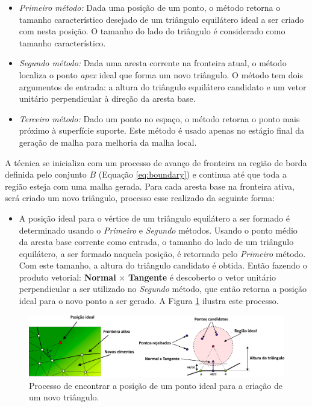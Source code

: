 \begin{itemize}  
\item \textit{Primeiro método:} Dada uma posição de um ponto, o método retorna o tamanho característico desejado de um triângulo equilátero ideal a ser criado com nesta posição. O tamanho do lado do triângulo é considerado como tamanho característico.
\item \textit{Segundo método:} Dada uma aresta corrente na fronteira atual, o método localiza o ponto \textit{apex} ideal que forma um novo triângulo. O método tem dois argumentos de entrada: a altura do triângulo equilátero candidato e um vetor unitário perpendicular à direção da aresta base. 
\item \textit{Terceiro método:} Dado um ponto no espaço, o método retorna o ponto mais próximo à superfície suporte. Este método é usado apenas no estágio final da geração de malha para melhoria da malha local.
\end{itemize}

A técnica se inicializa com um processo de avanço de fronteira na região de borda definida pelo conjunto $B$ (Equação \ref{eq:boundary}) e continua até que toda a região esteja com uma malha gerada. Para cada aresta base na fronteira ativa, será criado um novo triângulo, processo esse realizado da seguinte forma:

\begin{itemize}
    \item A posição ideal para o vértice de um triângulo equilátero a ser formado é determinado usando o \textit{Primeiro} e \textit{Segundo} métodos. Usando o ponto médio da aresta base corrente como entrada, o tamanho do lado de um triângulo equilátero, a ser formado naquela posição, é retornado pelo \textit{Primeiro} método. Com este tamanho, a altura do triângulo candidato é obtida. Então fazendo o produto vetorial: \textbf{Normal} $\times$ \textbf{Tangente} é descoberto o vetor unitário perpendicular a ser utilizado no \textit{Segundo} método, que então retorna a posição ideal para o novo ponto a ser gerado. A Figura \ref{fig:meshgeneration} ilustra este processo.
\end{itemize}

\begin{figure}[!h]
\captionsetup{width=\linewidth}
\centering
\includegraphics[width=\linewidth]{figuras/meshgeneration.jpg}
\caption{Processo de encontrar a posição de um ponto ideal para a criação de um novo triângulo.}
\label{fig:meshgeneration}
\end{figure}


